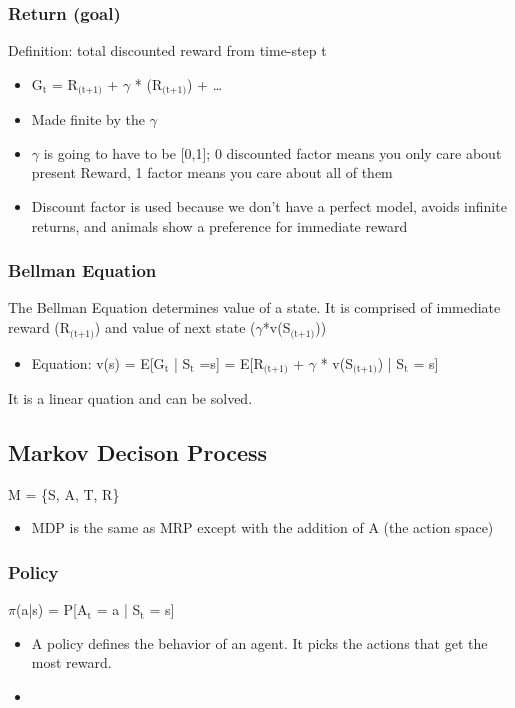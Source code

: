 \documentclass[11pt]{article}
\begin{document}
\subsubsection{Return (goal)}
\label{sec-1-2-1}
Definition: total discounted reward from time-step t
\begin{itemize}
\item G$_{\text{t}}$ = R$_{\text{(t+1)}}$ + $\gamma$ * (R$_{\text{(t+1)}}$) +  \ldots{}
\item Made finite by the $\gamma$
\item $\gamma$ is going to have to be [0,1]; 0 discounted factor means you only care about present Reward, 1 factor means you care about all of them
\item Discount factor is used because we don't have a perfect model, avoids infinite returns, and animals show a preference for immediate reward
\end{itemize}
\subsubsection{Bellman Equation}
\label{sec-1-2-2}
The Bellman Equation determines value of a state. It is comprised of immediate reward (R$_{\text{(t+1)}}$) and value of next state ($\gamma$*v(S$_{\text{(t+1)}}$))
\begin{itemize}
\item Equation: v(s) = E[G$_{\text{t}}$ | S$_{\text{t}}$ =s] = E[R$_{\text{(t+1)}}$ + $\gamma$ * v(S$_{\text{(t+1)}}$) | S$_{\text{t}}$ = s]
\end{itemize}
It is a linear quation and can be solved. 
\subsection{Markov Decison Process}
\label{sec-1-3}
M = \{S, A, T, R\}
\begin{itemize}
\item MDP is the same as MRP except with the addition of A (the action space)
\end{itemize}
\subsubsection{Policy}
\label{sec-1-3-1}
$\pi$(a|s) = P[A$_{\text{t}}$ = a | S$_{\text{t}}$ = s]
\begin{itemize}
\item A policy defines the behavior of an agent. It picks the actions that get the most reward.
\item 
\end{itemize}
\end{document}

